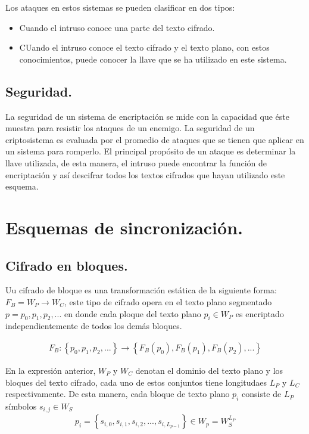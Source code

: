 \documentclass[10pt]{IEEEtran}
\begin{document}
Los ataques en estos sistemas se pueden clasificar en dos tipos:

\begin{itemize}
\item Cuando el intruso conoce una parte del texto cifrado.
\item CUando el intruso conoce el texto cifrado y el texto plano, con estos conocimientos, puede conocer la llave que se ha utilizado en este sistema.
\end{itemize}


\subsection*{Seguridad.}

La seguridad de un sistema de encriptación se mide con la capacidad que éste muestra para resistir los ataques de un enemigo. La seguridad de un criptosistema es evaluada por el promedio de ataques que se tienen que aplicar en un sistema para romperlo. El principal propósito de un ataque es determinar la llave utilizada, de esta manera, el intruso puede encontrar la función de encriptación  y así descifrar todos los textos cifrados que hayan utilizado este esquema.


\section{Esquemas de sincronización.}

\subsection*{Cifrado en bloques.}
Uu cifrado de bloque es una transformación estática de la siguiente forma: $F_{B}= W_{P} \longrightarrow W_{C} $, este tipo de cifrado opera en el texto plano segmentado $p= {p_{0}, p_{1}, p_{2},...}$ en donde cada ploque del texto plano $p_{i} \in W_{P}$ es encriptado independientemente de todos los demás bloques.


\begin{equation*}
\begin{aligned}
 F_{B}: \left\lbrace p_{0}, p_{1},p_{2},... \right\rbrace  \longrightarrow \left\lbrace F_{B}(p_{0}), F_{B}(p_{1}),F_{B}(p_{2}),...\right\rbrace 
\end{aligned}
\end{equation*}

En la expresión anterior, $W_{P}$ y $W_{C}$ denotan el dominio del texto plano  y los bloques del texto cifrado, cada uno de estos conjuntos tiene longitudaes $L_{P}$ y  $L_{C}$ respectivamente. De esta manera, cada bloque de texto plano $p_{i}$ consiste de $L_{P}$ símbolos $s_{i,j}  \in W_{S}$
\begin{equation*}
\begin{aligned}
p_{i}=\left\lbrace   s_{i,0},s_{i,1},s_{i,2},...,s_{i, L_{p-1}}   \right\rbrace \in W_{p}= W_{S}^{L_{P}}
\end{aligned}
\end{equation*}
\end{document}
